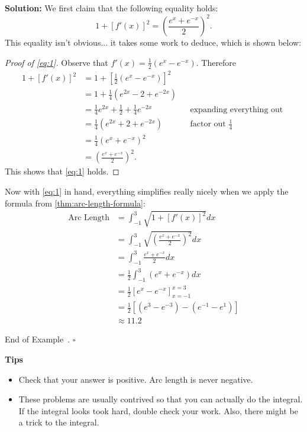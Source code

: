 \documentclass[10pt]{article}
\theoremstyle{definition}
\newtheorem{example}[theorem]{Example}
\renewenvironment{example}
{\begin{oldexample}}
  {\par\smallskip\hfill   End of Example~\theexample. $\square$    \par\end{oldexample}}
\newcommand{\vt}{\vskip 5mm} %
\newcommand{\Fl}{\vt\noindent\textbf} %
\newcommand{\1}[1]{\textbf{1}_{\left[#1\right]}} %
\begin{document}
\begin{max-comment}
\begin{example}[Arc length]
  \Fl{Solution:} We first claim that the following equality holds:
  \begin{equation}\label{eq:1}
    1+\left[ f'(x) \right]^{2}  = \left( \frac{e^{x}+e^{-x}}{2} \right)^{2}.
  \end{equation}
  This equality isn't obvious... it takes some work to deduce, which is shown below:
  \begin{proof}[Proof of \cref{eq:1}]
    Observe that $f'(x) = \frac{1}{2}(e^{x}-e^{-x})$. Therefore
    \begin{align*}
      1+\left[ f'(x) \right]^{2}
      &= 1 + \left[ \frac{1}{2}\left( e^{x}-e^{-x} \right)  \right]^{2}\\ 
      &= 1 + \frac{1}{4}\left( e^{2x} - 2 + e^{-2x} \right)\\ 
      &= \frac{1}{4} e^{2x} + \frac{1}{2} + \frac{1}{4}e^{-2x}  &&\text{expanding everything out } \\ 
      &= \frac{1}{4} \left( e^{2x}+2+e^{-2x} \right) &&\text{factor out $\frac{1}{4}$ }\\
      &= \frac{1}{4}\left( e^{x}+e^{-x} \right)^{2}\\ 
      &= \left( \frac{e^{x}+e^{-x}}{2} \right)^{2}. 
    \end{align*}
    This shows that \cref{eq:1} holds.
  \end{proof}

  Now with \cref{eq:1} in hand, everything simplifies really nicely when we apply the formula from
  \cref{thm:arc-length-formula}:
  \begin{align*}
    \text{Arc Length} 
    &= \int_{-1}^{3} \sqrt{1+\left[ f'(x) \right]^{2} }dx\\
    &= \int_{-1}^{3} \sqrt{\left( \frac{e^{x}+e^{-x}}{2} \right)^{2}  }dx\\
    &= \int_{-1}^{3} \frac{e^{x}+e^{-x}}{2}dx\\
    &= \frac{1}{2}\int_{-1}^{3} \left( e^{x}+e^{-x} \right) dx\\
    &= \frac{1}{2} \left[e^{x}-e^{-x} \right]_{x=-1}^{x=3}\\
    &= \frac{1}{2} \left[ \left( e^{3} - e^{-3} \right)  - \left( e^{-1}-e^{1} \right)  \right]\\
    &\approx 11.2
  \end{align*}  
\end{example}

\Fl{Tips}
\begin{itemize}
  \item Check that your answer is positive. Arc length is never negative.
  \item These problems are usually contrived so that you can actually do the integral. If the integral
  looks took hard, double check your work. Also, there might be a trick to the integral. 
\end{itemize}


\end{max-comment}
\end{document}
